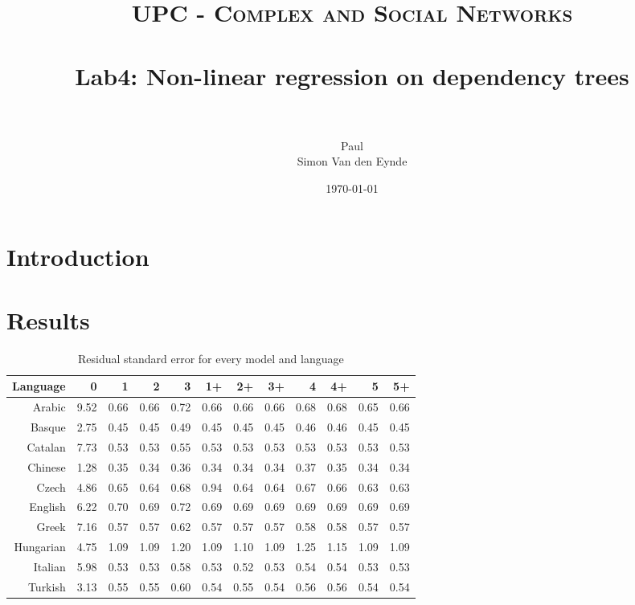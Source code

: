 \documentclass[paper=a4, fontsize=11pt]{scrartcl} %
\title{	
\normalfont \normalsize 
\textsc{UPC - Complex and Social Networks} \\ [25pt] %
\horrule{0.5pt} \\[0.4cm] %
\huge Lab4: Non-linear regression on dependency trees \\ %
\horrule{2pt} \\[0.5cm] %
}
\author{Paul\\Simon Van den Eynde} %
\date{\normalsize\today} %
\begin{document}
\maketitle %



\section{Introduction}

\section{Results}
\begin{table}
\begin{adjustbox}{center}
\centering
\begin{tabular}{rrrrrrrrrrrr}
  Language & 0 & 1 & 2 & 3 & 1+ & 2+ & 3+ & 4 & 4+ & 5 & 5+ \\ 
  \midrule
Arabic & 9.52 & 0.66 & 0.66 & 0.72 & 0.66 & 0.66 & 0.66 & 0.68 & 0.68 & 0.65 & 0.66 \\ 
  Basque & 2.75 & 0.45 & 0.45 & 0.49 & 0.45 & 0.45 & 0.45 & 0.46 & 0.46 & 0.45 & 0.45 \\ 
  Catalan & 7.73 & 0.53 & 0.53 & 0.55 & 0.53 & 0.53 & 0.53 & 0.53 & 0.53 & 0.53 & 0.53 \\ 
  Chinese & 1.28 & 0.35 & 0.34 & 0.36 & 0.34 & 0.34 & 0.34 & 0.37 & 0.35 & 0.34 & 0.34 \\ 
  Czech & 4.86 & 0.65 & 0.64 & 0.68 & 0.94 & 0.64 & 0.64 & 0.67 & 0.66 & 0.63 & 0.63 \\ 
  English & 6.22 & 0.70 & 0.69 & 0.72 & 0.69 & 0.69 & 0.69 & 0.69 & 0.69 & 0.69 & 0.69 \\ 
  Greek & 7.16 & 0.57 & 0.57 & 0.62 & 0.57 & 0.57 & 0.57 & 0.58 & 0.58 & 0.57 & 0.57 \\ 
  Hungarian & 4.75 & 1.09 & 1.09 & 1.20 & 1.09 & 1.10 & 1.09 & 1.25 & 1.15 & 1.09 & 1.09 \\ 
  Italian & 5.98 & 0.53 & 0.53 & 0.58 & 0.53 & 0.52 & 0.53 & 0.54 & 0.54 & 0.53 & 0.53 \\ 
  Turkish & 3.13 & 0.55 & 0.55 & 0.60 & 0.54 & 0.55 & 0.54 & 0.56 & 0.56 & 0.54 & 0.54 \\ 
   \bottomrule
\end{tabular}
\end{adjustbox}
\caption{Residual standard error for every model and language}
\label{tab:s}
\end{table}
\end{document}

